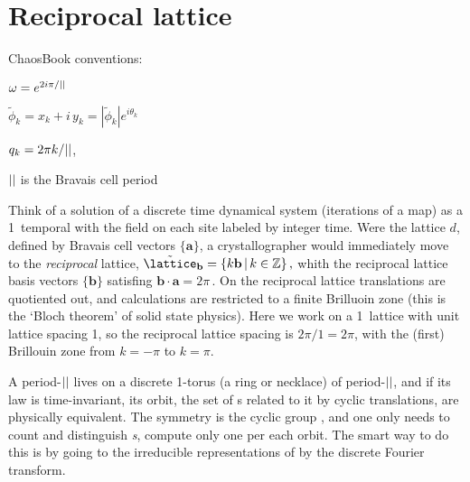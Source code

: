 

\section{Reciprocal lattice}
\label{sect:LC21recip1d} %

ChaosBook conventions:
\renewcommand{\cssp}{\ensuremath{\tilde{\phi}}}                %

$\omega = e^{2i\pi/{||}}$

$\cssp_k=x_k+i\,y_k = |\cssp_k| e^{i\theta_k}$

$q_k=2\pi{k}/{||}$,

${||}$ is the Bravais cell period

\bigskip

Think of a solution of a discrete time dynamical system (iterations of a map) as a
1\dmn\ temporal {\lattstate} with the field on each site labeled by integer
time.
Were the lattice $d$\dmn, defined by Bravais cell vectors $\{\mathbf{a}\}$, a
crystallographer would immediately move to the \emph{reciprocal}
lattice,
\( %
\tilde{\lattice}_{\mathbf{b}} = \{k \mathbf{b}\,|\, k \in \mathbb{Z}\}
\,,
\) %
whith the {reciprocal}
lattice basis vectors $\{\mathbf{b}\}$ satisfing
\( %
\mathbf{b} \cdot \mathbf{a} = 2 \pi
\,.
\) %
On the {reciprocal} lattice translations are
quotiented out, and calculations are restricted to a finite
{Brilluoin zone} (this is the {`Bloch theorem'} of
solid state physics). Here we work on a 1\dmn\ lattice with unit
lattice spacing 1, so the reciprocal lattice spacing is $2\pi/1=2\pi$, with
the (first) Brillouin zone from $k=-\pi$ to $k=\pi$.

A period-${||}$ {\lattstate} lives on a discrete 1-torus (a ring or
necklace) of period-${||}$, and if its law is time-invariant, its orbit, the set of
{\lattstate}s related to it by cyclic translations, are
physically equivalent. The symmetry is the cyclic group
, and one only needs to count and distinguish  \emph{{\orbit}s},
compute only one {\lattstate} per each orbit.
The smart way to do this is by going to the irreducible representations
of  by the discrete Fourier transform.


